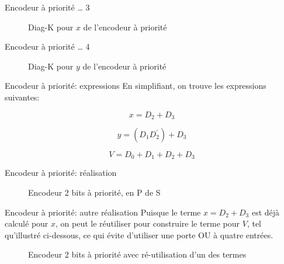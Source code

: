 \documentclass[presentation]{beamer}
\begin{document}
\begin{frame}[label={sec:orgce17ae5}]{Encodeur à priorité \ldots{} 3}
\begin{figure}[htbp]
\centering

\caption{\label{fig:org1ba36b6}Diag-K pour \(x\) de l'encodeur à priorité}
\end{figure}
\end{frame}

\begin{frame}[label={sec:orgb53fb9b}]{Encodeur à priorité \ldots{} 4}
\begin{figure}[htbp]
\centering

\caption{\label{fig:org43e7eee}Diag-K pour \(y\) de l'encodeur à priorité}
\end{figure}
\end{frame}

\begin{frame}[label={sec:org0a649d8}]{Encodeur à priorité: expressions}
En simplifiant, on trouve les expressions suivantes:

$$ x = D_2 + D_3 $$

$$ y = (D_1 D_2^\prime) + D_3 $$

$$ V = D_0 + D_1 + D_2 + D_3 $$
\end{frame}

\begin{frame}[label={sec:org3765ddc}]{Encodeur à priorité: réalisation}
\begin{figure}[htbp]
\centering

\caption{\label{fig:org37c7f1c}Encodeur 2 bits à priorité, en P de S}
\end{figure}
\end{frame}

\begin{frame}[label={sec:org67ce432}]{Encodeur à priorité: autre réalisation}
Puisque le terme \(x = D_2 + D_3\) est déjà calculé pour \(x\), on
peut le réutiliser pour construire le terme pour \(V\), tel
qu'illustré ci-dessous, ce qui évite d'utiliser une porte OU à quatre
entrées.

\begin{figure}[htbp]
\centering

\caption{\label{fig:org73f303c}Encodeur 2 bits à priorité avec ré-utilisation d'un des termes}
\end{figure}
\end{frame}
\end{document}
